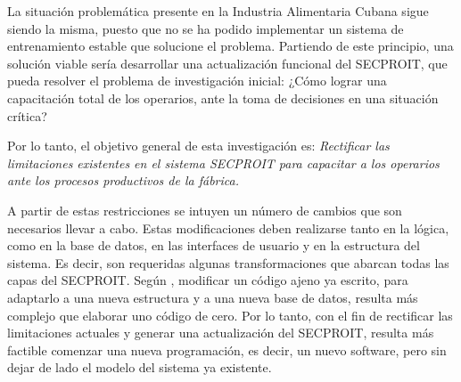 La situación problemática presente en la Industria Alimentaria Cubana sigue siendo la misma, puesto que no se ha podido implementar un sistema de entrenamiento estable que solucione el problema. Partiendo de este principio, una solución viable sería desarrollar una actualización funcional del SECPROIT, que pueda resolver el problema de investigación inicial: 
¿Cómo lograr una capacitación total de los operarios, ante la toma de decisiones en una situación crítica?

Por lo tanto, el objetivo general de esta investigación es: 
\textsl{Rectificar las limitaciones existentes en el sistema SECPROIT para capacitar a los operarios ante los procesos productivos de la fábrica.}

A partir de estas restricciones se intuyen un número de cambios que son necesarios llevar a cabo. Estas modificaciones deben realizarse tanto en la lógica, como en la base de datos, en las interfaces de usuario y en la estructura del sistema. Es decir, son requeridas algunas transformaciones que abarcan todas las capas del SECPROIT.  Según \cite{Plecka2013}, modificar un código ajeno ya escrito, para adaptarlo a una nueva estructura y a una nueva base de datos, resulta más complejo que elaborar uno código de cero. Por lo tanto, con el fin de rectificar las limitaciones actuales y generar una actualización del SECPROIT, resulta más factible comenzar una nueva programación, es decir, un nuevo software, pero sin dejar de lado el modelo del sistema ya existente.

